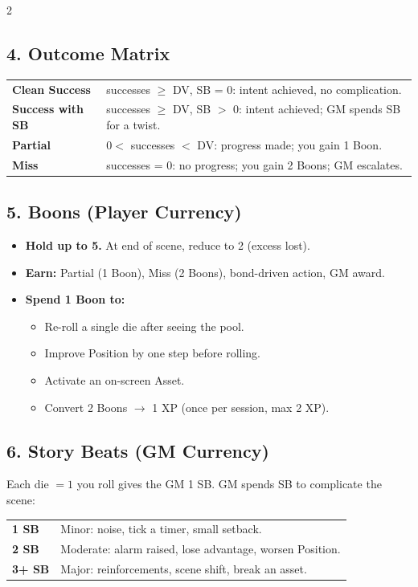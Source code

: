 \documentclass[10pt,landscape]{article}
\begin{document}
\begin{multicols}{2}
\subsection*{4. Outcome Matrix}
\begin{tabularx}{\linewidth}{@{} l X @{}}
\textbf{Clean Success}      & successes $\ge$ DV, SB = 0: intent achieved, no complication. \\
\textbf{Success with SB}    & successes $\ge$ DV, SB $>$ 0: intent achieved; GM spends SB for a twist. \\
\textbf{Partial}            & $0 <$ successes $<$ DV: progress made; you gain 1 Boon. \\
\textbf{Miss}               & successes = 0: no progress; you gain 2 Boons; GM escalates. \\
\end{tabularx}

\subsection*{5. Boons (Player Currency)}
\begin{itemize}
    \item \textbf{Hold up to 5.} At end of scene, reduce to 2 (excess lost).
    \item \textbf{Earn:} Partial (1 Boon), Miss (2 Boons), bond-driven action, GM award.
    \item \textbf{Spend 1 Boon to:}
    \begin{itemize}
        \item Re-roll a single die after seeing the pool.
        \item Improve Position by one step before rolling.
        \item Activate an on-screen Asset.
        \item Convert 2 Boons $\rightarrow$ 1 XP (once per session, max 2 XP).
    \end{itemize}
\end{itemize}

\subsection*{6. Story Beats (GM Currency)}
Each die $=1$ you roll gives the GM 1 SB. GM spends SB to complicate the scene:
\begin{tabularx}{\linewidth}{@{} l X @{}}
\textbf{1 SB}  & Minor: noise, tick a timer, small setback. \\
\textbf{2 SB}  & Moderate: alarm raised, lose advantage, worsen Position. \\
\textbf{3+ SB} & Major: reinforcements, scene shift, break an asset. \\
\end{tabularx}


\end{multicols}
\end{document}
